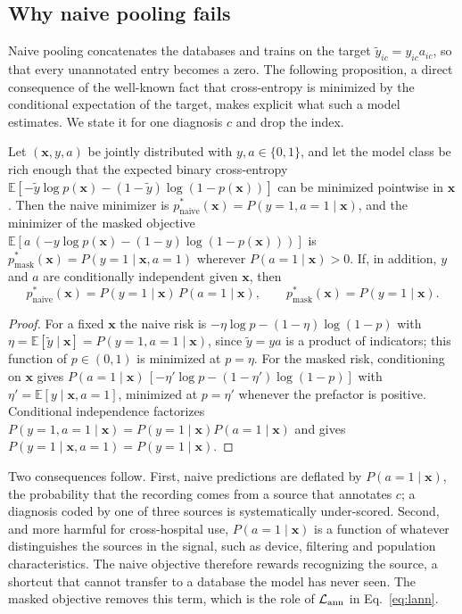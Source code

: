 \subsection{Why naive pooling fails}\label{sec:why}
Naive pooling concatenates the databases and trains on the target $\tilde y_{ic}=y_{ic}a_{ic}$, so that every unannotated entry becomes a zero. The following proposition, a direct consequence of the well-known fact that cross-entropy is minimized by the conditional expectation of the target, makes explicit what such a model estimates. We state it for one diagnosis $c$ and drop the index.

\begin{proposition}\label{prop:naive}
Let $(\mathbf{x},y,a)$ be jointly distributed with $y,a\in\{0,1\}$, and let the model class be rich enough that the expected binary cross-entropy $\mathbb{E}[-\tilde y\log p(\mathbf{x})-(1-\tilde y)\log(1-p(\mathbf{x}))]$ can be minimized pointwise in $\mathbf{x}$. Then the naive minimizer is $p^\ast_{\mathrm{naive}}(\mathbf{x})=P(y=1,a=1\mid\mathbf{x})$, and the minimizer of the masked objective $\mathbb{E}[a\,(-y\log p(\mathbf{x})-(1-y)\log(1-p(\mathbf{x})))]$ is $p^\ast_{\mathrm{mask}}(\mathbf{x})=P(y=1\mid\mathbf{x},a=1)$ wherever $P(a=1\mid\mathbf{x})>0$. If, in addition, $y$ and $a$ are conditionally independent given $\mathbf{x}$, then
\begin{equation}
p^\ast_{\mathrm{naive}}(\mathbf{x})=P(y=1\mid\mathbf{x})\,P(a=1\mid\mathbf{x}),
\qquad
p^\ast_{\mathrm{mask}}(\mathbf{x})=P(y=1\mid\mathbf{x}).
\label{eq:prop}
\end{equation}
\end{proposition}

\begin{proof}
For a fixed $\mathbf{x}$ the naive risk is $-\eta\log p-(1-\eta)\log(1-p)$ with $\eta=\mathbb{E}[\tilde y\mid\mathbf{x}]=P(y=1,a=1\mid\mathbf{x})$, since $\tilde y=ya$ is a product of indicators; this function of $p\in(0,1)$ is minimized at $p=\eta$. For the masked risk, conditioning on $\mathbf{x}$ gives $P(a=1\mid\mathbf{x})\,[-\eta'\log p-(1-\eta')\log(1-p)]$ with $\eta'=\mathbb{E}[y\mid\mathbf{x},a=1]$, minimized at $p=\eta'$ whenever the prefactor is positive. Conditional independence factorizes $P(y=1,a=1\mid\mathbf{x})=P(y=1\mid\mathbf{x})P(a=1\mid\mathbf{x})$ and gives $P(y=1\mid\mathbf{x},a=1)=P(y=1\mid\mathbf{x})$.
\end{proof}

Two consequences follow. First, naive predictions are deflated by $P(a=1\mid\mathbf{x})$, the probability that the recording comes from a source that annotates $c$; a diagnosis coded by one of three sources is systematically under-scored. Second, and more harmful for cross-hospital use, $P(a=1\mid\mathbf{x})$ is a function of whatever distinguishes the sources in the signal, such as device, filtering and population characteristics. The naive objective therefore rewards recognizing the source, a shortcut that cannot transfer to a database the model has never seen. The masked objective removes this term, which is the role of $\mathcal{L}_{\mathrm{ann}}$ in Eq.~\eqref{eq:lann}.

